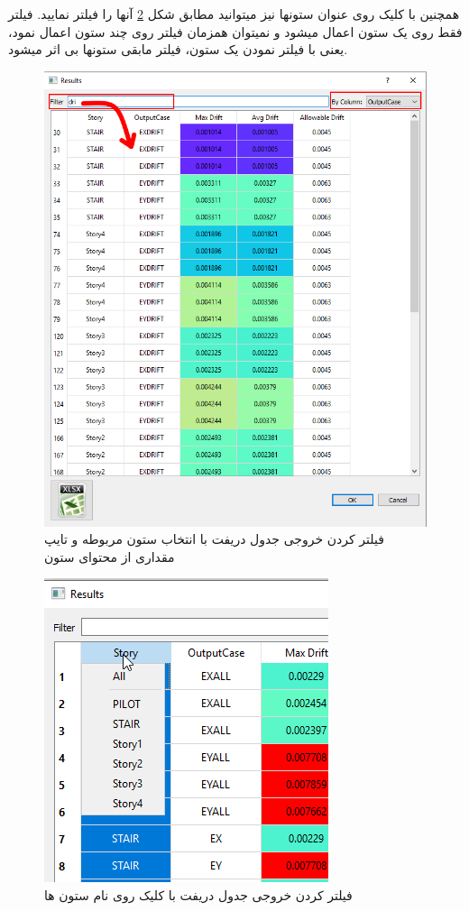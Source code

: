 همچنین با کلیک روی عنوان ستونها نیز میتوانید مطابق شکل 
\ref{pic:drift_filter}
 آنها را فیلتر نمایید. فیلتر فقط روی یک ستون اعمال میشود و نمیتوان همزمان فیلتر روی چند ستون اعمال نمود، یعنی با فیلتر نمودن یک ستون، فیلتر مابقی ستونها بی اثر میشود.
 
 \begin{figure}
    \centering
    \includegraphics[scale=0.7]{figures/drift}
    \caption{فیلتر کردن خروجی جدول دریفت با انتخاب ستون مربوطه و تایپ  مقداری از محتوای ستون}
    \label{pic:drift}
\end{figure}
 
 \begin{figure}
     \centering
     \includegraphics[scale=0.7]{figures/drift_filter}
     \caption{فیلتر کردن خروجی جدول دریفت با کلیک روی نام ستون ها}
     \label{pic:drift_filter}
 \end{figure}
 
